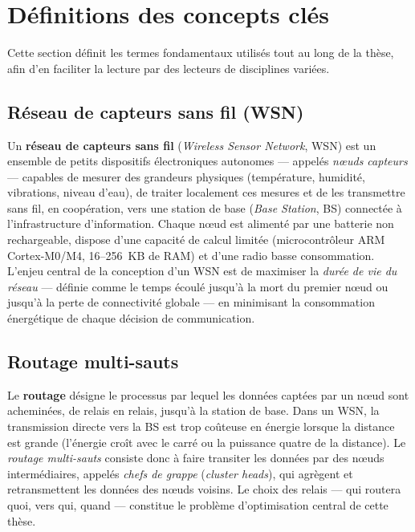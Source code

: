 \section{Définitions des concepts clés}\label{sec:intro-definitions}

Cette section définit les termes fondamentaux utilisés tout au long de la thèse, afin d'en faciliter la lecture par des lecteurs de disciplines variées.

\subsection*{Réseau de capteurs sans fil (WSN)}

Un \textbf{réseau de capteurs sans fil} (\emph{Wireless Sensor Network}, WSN) est un ensemble de petits dispositifs électroniques autonomes --- appelés \emph{nœuds capteurs} --- capables de mesurer des grandeurs physiques (température, humidité, vibrations, niveau d'eau), de traiter localement ces mesures et de les transmettre sans fil, en coopération, vers une station de base (\emph{Base Station}, BS) connectée à l'infrastructure d'information. Chaque nœud est alimenté par une batterie non rechargeable, dispose d'une capacité de calcul limitée (microcontrôleur ARM Cortex-M0/M4, 16--256~KB de RAM) et d'une radio basse consommation. L'enjeu central de la conception d'un WSN est de maximiser la \emph{durée de vie du réseau} --- définie comme le temps écoulé jusqu'à la mort du premier nœud ou jusqu'à la perte de connectivité globale --- en minimisant la consommation énergétique de chaque décision de communication.

\subsection*{Routage multi-sauts}

Le \textbf{routage} désigne le processus par lequel les données captées par un nœud sont acheminées, de relais en relais, jusqu'à la station de base. Dans un WSN, la transmission directe vers la BS est trop coûteuse en énergie lorsque la distance est grande (l'énergie croît avec le carré ou la puissance quatre de la distance). Le \emph{routage multi-sauts} consiste donc à faire transiter les données par des nœuds intermédiaires, appelés \emph{chefs de grappe} (\emph{cluster heads}), qui agrègent et retransmettent les données des nœuds voisins. Le choix des relais --- qui routera quoi, vers qui, quand --- constitue le problème d'optimisation central de cette thèse.

